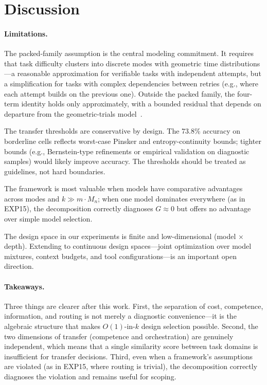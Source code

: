 \documentclass[11pt]{article}
\newcommand{\Mn}{M_n}
\begin{document}
\section{Discussion}
\label{sec:discussion}

\paragraph{Limitations.}
The packed-family assumption is the central modeling commitment.
It requires that task difficulty clusters into discrete modes with
geometric time distributions---a reasonable approximation for
verifiable tasks with independent attempts, but a simplification for
tasks with complex dependencies between retries (e.g., where each
attempt builds on the previous one).  Outside the packed family, the
four-term identity holds only approximately, with a bounded residual
that depends on departure from the geometric-trials
model~\citep{beneventano2026framework}.

The transfer thresholds are conservative by design.  The 73.8\% accuracy
on borderline cells reflects worst-case Pinsker and entropy-continuity
bounds; tighter bounds (e.g., Bernstein-type refinements or empirical
validation on diagnostic samples) would likely improve accuracy.  The
thresholds should be treated as guidelines, not hard boundaries.

The framework is most valuable when models have comparative advantages across modes and $k \gg m \cdot \Mn$; when one model dominates everywhere (as in EXP15), the decomposition correctly diagnoses $G \approx 0$ but offers no advantage over simple model selection.

The design space in our experiments is finite and low-dimensional
(model $\times$ depth).  Extending to continuous design spaces---joint
optimization over model mixtures, context budgets, and tool
configurations---is an important open direction.

\paragraph{Takeaways.}
Three things are clearer after this work.
First, the separation of cost, competence, information, and routing
is not merely a diagnostic convenience---it is the algebraic structure
that makes $O(1)$-in-$k$ design selection possible.
Second, the two dimensions of transfer (competence and orchestration)
are genuinely independent, which means that a single similarity score
between task domains is insufficient for transfer decisions.
Third, even when a framework's assumptions are violated (as in EXP15,
where routing is trivial), the decomposition correctly diagnoses the
violation and remains useful for scoping.
\end{document}
